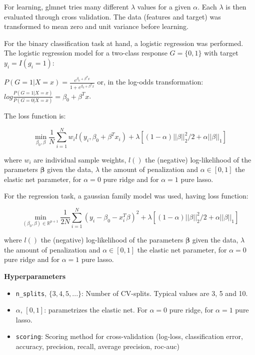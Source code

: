 \documentclass[
  11pt,
  a4paper,
  DIV=12,captions=tableheading,oneside,titlepage=firstiscover,abstracton]{scrreprt}
\providecommand{\tightlist}{%
  \setlength{\itemsep}{0pt}\setlength{\parskip}{0pt}}
\providecommand{\tightlist}{%
  \setlength{\itemsep}{0pt}\setlength{\parskip}{0pt}}
\begin{document}
For learning, glmnet tries many different \(\lambda\) values for a given \(\alpha\). Each \(\lambda\) is then evaluated through cross validation. The data (features and target) was transformed to mean zero and unit variance before learning.

For the binary classification task at hand, a logistic regression was performed. The logistic regression model for a two-class response \(G = \{0,1\}\) with target \(y_i = I(g_i=1)\):

\(P(G=1|X=x) = \frac{e^{\beta_0+\beta^Tx}}{1+e^{\beta_0+\beta^Tx}}\) or, in the log-odds transformation: \(log\frac{P(G=1|X=x)}{P(G=0|X=x)}=\beta_0+\beta^Tx\).

The loss function is:

\begin{equation}
\min_{\beta_0,\beta} \frac{1}{N} \sum_{i=1}^{N} w_i l(y_i,\beta_0+\beta^T x_i) + \lambda\left[(1-\alpha)||\beta||_2^2/2 + \alpha ||\beta||_1\right]
\label{eq:glmnet-logit}
\end{equation}

where \(w_i\) are individual sample weights, \(l()\) the (negative) log-likelihood of the parameters \(\mathbf{\beta}\) given the data, \(\lambda\) the amount of penalization and \(\alpha \in [0,1]\) the elastic net parameter, for \(\alpha=0\) pure ridge and for \(\alpha=1\) pure lasso.

For the regression task, a gaussian family model was used, having loss function:

\begin{equation}
\min_{(\beta_0, \beta) \in \mathbb{R}^{p+1}}\frac{1}{2N} \sum_{i=1}^N (y_i -\beta_0-x_i^T \beta)^2+\lambda \left[ (1-\alpha)||\beta||_2^2/2 + \alpha||\beta||_1\right]
\label{eq:glmnet-gaussian}
\end{equation}

where \(l()\) the (negative) log-likelihood of the parameters \(\mathbf{\beta}\) given the data, \(\lambda\) the amount of penalization and \(\alpha \in [0,1]\) the elastic net parameter, for \(\alpha=0\) pure ridge and for \(\alpha=1\) pure lasso.

\textbf{Hyperparameters}

\begin{itemize}
\tightlist
\item
  \texttt{n\_splits}, \(\{3,4,5, ...\}\): Number of CV-splits. Typical values are 3, 5 and 10.
\item
  \(\alpha\), \([0, 1]\): parametrizes the elastic net. For \(\alpha = 0\) pure ridge, for \(\alpha = 1\) pure lasso.
\item
  \texttt{scoring}: Scoring method for cross-validation (log-loss, classification error, accuracy, precision, recall, average precision, roc-auc)
\end{itemize}
\end{document}
